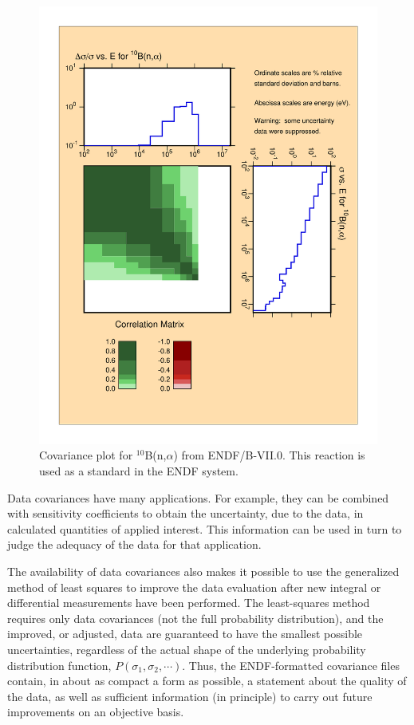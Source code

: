 \begin{figure}[thb]\centering
\includegraphics[keepaspectratio, width=5.0in,angle=0]{figs/b10covack}
\caption[ENDF/B-VII.0 $^{10}$B(n,$\alpha$) covariance data]{Covariance
 plot for $^{10}$B(n,$\alpha$) from ENDF/B-VII.0.  This reaction is used as
 a standard in the ENDF system.}
\label{b10cov}
\end{figure}

Data covariances have many applications.  For example, they can be
combined with sensitivity coefficients to obtain the uncertainty, due
to the data, in calculated quantities of applied interest\cite{Gerstl}.
This information can be used in turn to judge the adequacy of the data
for that application.

The availability of data covariances also makes it possible to use the
generalized method of least squares to improve the data evaluation
after new integral or differential measurements have been
performed\cite{Reupke}.  The least-squares method requires only data
covariances (not the full probability distribution), and the improved,
or adjusted, data are guaranteed\cite{Hamilton} to have the smallest
possible uncertainties, regardless of the actual shape of the underlying
probability distribution function, $P(\sigma_1, \sigma_2,\cdots)$.
Thus, the ENDF-formatted covariance files contain, in about as compact
a form as possible, a statement about the quality of the data, as well
as sufficient information (in principle) to carry out future
improvements on an objective basis.

